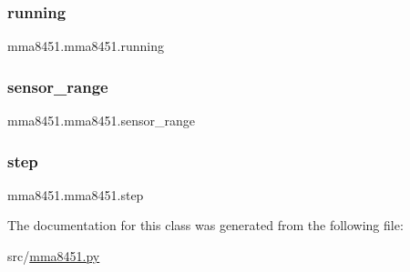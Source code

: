 \subsubsection{\texorpdfstring{running}{running}}
{\footnotesize\ttfamily mma8451.\+mma8451.\+running}

\mbox{\label{classmma8451_1_1mma8451_a5051bf544957722f005045e8a16eb2e8}} 
\subsubsection{\texorpdfstring{sensor\+\_\+range}{sensor\_range}}
{\footnotesize\ttfamily mma8451.\+mma8451.\+sensor\+\_\+range}

\mbox{\label{classmma8451_1_1mma8451_a5d0f9139629bb4316b3109e521368876}} 
\subsubsection{\texorpdfstring{step}{step}}
{\footnotesize\ttfamily mma8451.\+mma8451.\+step}



The documentation for this class was generated from the following file\+:\begin{DoxyCompactItemize}
\item 
src/\hyperlink{mma8451_8py}{mma8451.\+py}\end{DoxyCompactItemize}
